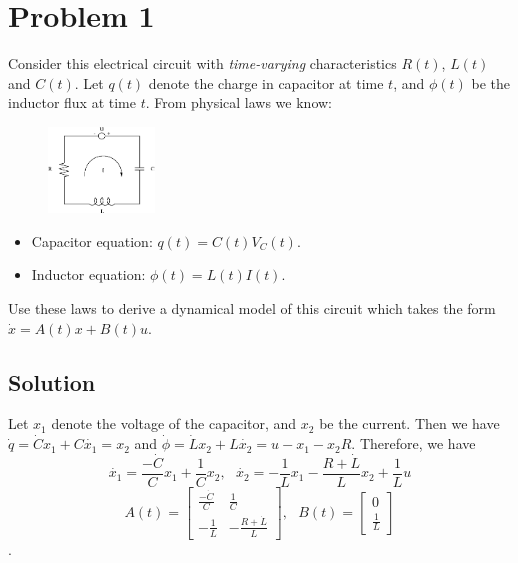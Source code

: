 \documentclass[11pt]{report}
\theoremstyle{definition}
\begin{document}

\section*{Problem 1}
Consider this electrical circuit with \emph{time-varying} characteristics $R(t)$, $L(t)$ and $C(t)$. Let $q(t)$ denote the charge in capacitor at time $t$, and $\phi(t)$ be the inductor flux at time $t$. From physical laws we know:

\begin{figure}[H]
	\centering
	\vspace{1em}
	\includegraphics[trim = 0mm 0mm 0mm 20mm,height=0.9in]{circuit.eps}
\end{figure}

\begin{itemize}
\item Capacitor equation: $q(t) = C(t)V_C(t)$.
\item Inductor equation: $\phi(t)= L(t)I(t)$.
\end{itemize}
Use these laws to derive a dynamical model of this circuit which takes the form $\dot x=A(t)x+B(t)u$.

\subsection*{Solution}
Let $x_1$ denote the voltage of the capacitor, and $x_2$ be the current. Then we have $\dot{q} = \dot{C}x_1 + C\dot{x_1} = x_2$ and $\dot{\phi} = \dot{L}x_2 + L\dot{x_2} = u - x_1 - x_2R$. Therefore, we have $$\dot{x_1} = \frac{-\dot{C}}{C}x_1 + \frac{1}{C}x_2,~~~\dot{x_2} = -\frac{1}{L}x_1 - \frac{R+\dot{L}}{L}x_2 + \frac{1}{L}u$$
$$A(t) = \begin{bmatrix}\frac{-\dot{C}}{C} & \frac{1}{C}\\-\frac{1}{L} & -\frac{R+\dot{L}}{L}\end{bmatrix},~~~B(t) = \begin{bmatrix}0\\\frac{1}{L}\end{bmatrix}$$.
\end{document}
